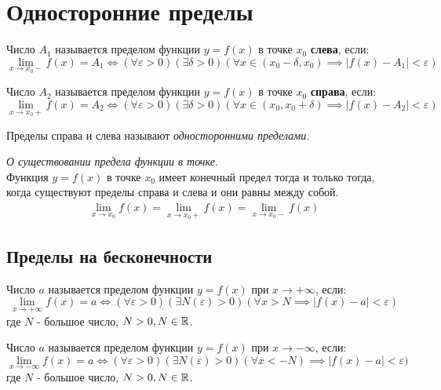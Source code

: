 \section{Односторонние пределы}

\begin{definition}
  Число $A_1$ называется пределом функции $y = f(x)$ в точке $x_0$ \textbf{слева}, если: \[
  \lim_{x \to x_0-} f(x) = A_1 \iff 
  (\forall \varepsilon > 0)(\exists \delta > 0)(\forall x \in (x_0 - \delta, x_0) \implies |f(x) - A_1| < \varepsilon)
  \] 
\end{definition}

\begin{definition}
  Число $A_2$ называется пределом функции $y = f(x)$ в точке $x_0$ \textbf{справа}, если: \[
  \lim_{x \to x_0+} f(x) = A_2 \iff
  (\forall \varepsilon > 0)(\exists \delta > 0)(\forall x \in (x_0, x_0 + \delta) \implies |f(x) - A_2| < \varepsilon)
  \] 
\end{definition}

Пределы справа и слева называют \textit{односторонними пределами}.

\begin{theorem}
  \textit{О существовании предела функции в точке}. \\
  Функция $y = f(x)$ в точке  $x_0$ имеет конечный предел тогда и только тогда, когда существуют пределы справа и слева и они равны между собой.
  \begin{gather*}
    \lim_{x \to x_0} f(x) = \lim_{x \to x_0+} f(x) = \lim_{x \to x_0-} f(x) 
  \end{gather*}
\end{theorem}

\subsection{Пределы на бесконечности}

\begin{definition}
  Число $a$ называется пределом функции $y = f(x)$ при $x \to + \infty$, если: \[
  \lim_{x \to +\infty} f(x) = a \iff (\forall \varepsilon > 0)(\exists N(\varepsilon) > 0)(\forall x > N \implies |f(x) - a| < \varepsilon)
  \] 
  где $N$ - большое число, $N > 0, N \in \mathbb{R}$.
\end{definition}

\begin{definition}
  Число $a$ называется пределом функции $y = f(x)$ при $x \to - \infty$, если: \[
  \lim_{x \to -\infty} f(x) = a \iff (\forall \varepsilon > 0)(\exists N(\varepsilon) > 0)(\forall x < -N) \implies |f(x) - a| < \varepsilon)
  \] 
  где $N$ - большое число, $N > 0, N \in \mathbb{R}$.
\end{definition}

